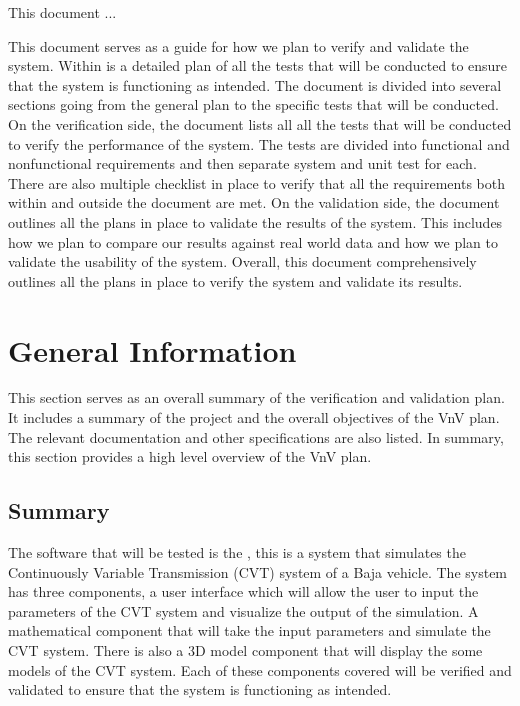 \documentclass[12pt, titlepage]{article}
\begin{document}
This document ... 

\noindent This document serves as a guide for how we plan to verify and validate the \progname{} system.
Within is a detailed plan of all the tests that will be conducted to ensure that the system is functioning as intended.
The document is divided into several sections going from the general plan to the specific tests that will be conducted.
On the verification side, the document lists all all the tests that will be conducted to verify the performance of the system.
The tests are divided into functional and nonfunctional requirements and then separate system and unit test for each.
There are also multiple checklist in place to verify that all the requirements both within and outside the document are met.
On the validation side, the document outlines all the plans in place to validate the results of the system.
This includes how we plan to compare our results against real world data and how we plan to validate the usability of the system.
Overall, this document comprehensively outlines all the plans in place to verify the system and validate its results.

\section{General Information}

This section serves as an overall summary of the verification and validation plan.
It includes a summary of the project and the overall objectives of the VnV plan.
The relevant documentation and other specifications are also listed.
In summary, this section provides a high level overview of the VnV plan.

\subsection{Summary}

The software that will be tested is the \progname{}, this is a system that simulates the Continuously Variable Transmission (CVT) system of a Baja vehicle.
The system has three components, a user interface which will allow the user to input the parameters of the CVT system and visualize the output of the simulation.
A mathematical component that will take the input parameters and simulate the CVT system.
There is also a 3D model component that will display the some models of the CVT system. 
Each of these components covered will be verified and validated to ensure that the system is functioning as intended.
\end{document}

